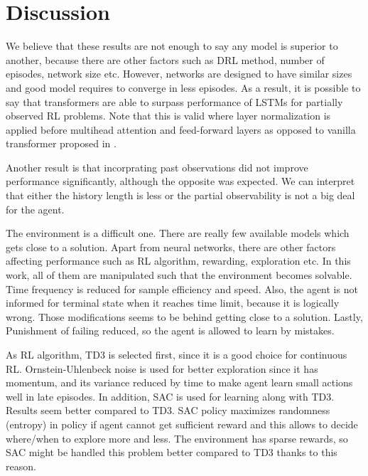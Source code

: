 \section{Discussion}
We believe that these results are not enough to say any model is superior to another, because there are other factors such as DRL method, number of episodes, network size etc. 
However, networks are designed to have similar sizes and good model requires to converge in less episodes. 
As a result, it is possible to say that transformers are able to surpass performance of LSTMs for partially observed RL problems. 
Note that this is valid where layer normalization is applied before multihead attention and feed-forward layers \cite{xiong_layer_2020} as opposed to vanilla transformer proposed in \cite{vaswani_attention_2017}. 

Another result is that incorprating past observations did not improve performance significantly, although the opposite was expected. 
We can interpret that either the history length is less or the partial observability is not a big deal for the agent. 

The environment is a difficult one. 
There are really few available models which gets close to a solution. 
Apart from neural networks, there are other factors affecting performance such as RL algorithm, rewarding, exploration etc. 
In this work, all of them are manipulated such that the environment becomes solvable. 
Time frequency is reduced for sample efficiency and speed. 
Also, the agent is not informed for terminal state when it reaches time limit, because it is logically wrong. Those modifications seems to be behind getting close to a solution. 
Lastly, Punishment of failing reduced, so the agent is allowed to learn by mistakes. 

As RL algorithm, TD3 is selected first, since it is a good choice for continuous RL. 
Ornstein-Uhlenbeck noise is used for better exploration since it has momentum, and its variance reduced by time to make agent learn small actions well in late episodes. 
In addition, SAC is used for learning along with TD3. Results seem better compared to TD3. 
SAC policy maximizes randomness (entropy) in policy if agent cannot get sufficient reward and this allows to decide where/when to explore more and less. 
The environment has sparse rewards, so SAC might be handled this problem better compared to TD3 thanks to this reason.

